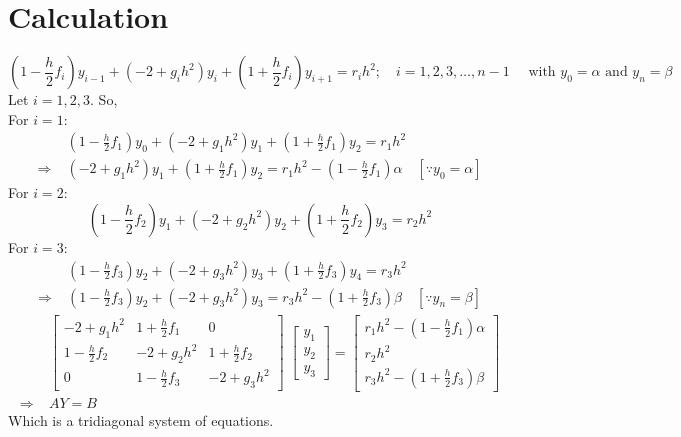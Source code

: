 \documentclass[../main-sheet.tex]{subfiles}
\begin{document}
\section{Calculation}
\[
    \left( 1-\frac{h}{2}f_i \right)y_{i-1}+\left( -2+g_ih^2 \right)y_i+\left( 1+\frac{h}{2}f_i \right)y_{i+1}=r_i h^2;\quad i=1,2,3,\dots,n-1 \quad \text{ with }y_0=\alpha\text{ and }y_n=\beta
    \]
    Let \(i=1,2,3\). So,\\
    For \(i=1\):
    \begin{align*}
        &\left( 1-\frac{h}{2}f_1 \right)y_{0}+\left( -2+g_1h^2 \right)y_1+\left( 1+\frac{h}{2}f_1 \right)y_{2}=r_1 h^2\\
        \Rightarrow\; &\left( -2+g_1h^2 \right)y_1+\left( 1+\frac{h}{2}f_1 \right)y_{2}=r_1 h^2-\left( 1-\frac{h}{2}f_1 \right)\alpha\quad[\because y_0=\alpha]
    \end{align*}
    For \(i=2\):
    \[
        \left( 1-\frac{h}{2}f_2 \right)y_{1}+\left( -2+g_2h^2 \right)y_2+\left( 1+\frac{h}{2}f_2 \right)y_{3}=r_2 h^2
        \]
        For \(i=3\):
        \begin{align*}
            &\left( 1-\frac{h}{2}f_3 \right)y_{2}+\left( -2+g_3h^2 \right)y_3+\left( 1+\frac{h}{2}f_3 \right)y_{4}=r_3 h^2\\
            \Rightarrow\; &\left( 1-\frac{h}{2}f_3 \right)y_2+\left( -2+g_3h^2 \right)y_3=r_3 h^2-\left( 1+\frac{h}{2}f_3 \right)\beta \quad[\because y_n=\beta]
        \end{align*}
        \begin{align*}
            &{\begin{bmatrix}
                -2+g_1h^2 & 1+\frac{h}{2}f_1 & 0\\[1em]
                1-\frac{h}{2}f_2 & -2+g_2h^2 & 1+\frac{h}{2}f_2\\[1em]
                0 & 1-\frac{h}{2}f_3 & -2+g_3h^2 
            \end{bmatrix}\;\begin{bmatrix}
                y_1\\[1em]
                y_2\\[1em]
                y_3
            \end{bmatrix}=\begin{bmatrix}
                r_1 h^2-\left( 1-\frac{h}{2}f_1 \right)\alpha\\[1em]
                r_2 h^2\\[1em]
                r_3 h^2-\left( 1+\frac{h}{2}f_3 \right)\beta  
            \end{bmatrix}}\\
            \Rightarrow\; & AY=B
        \end{align*}
        Which is a tridiagonal system of equations.
\end{document}
